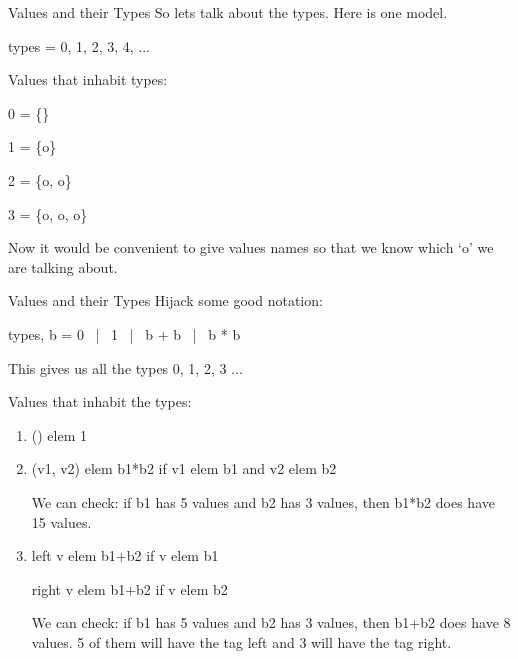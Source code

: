 \documentclass[svgnames,11pt]{beamer}
\begin{document}
\begin{frame}{Values and their Types}
So lets talk about the types. Here is one model. 

\vfill
\begin{block}

types = 0, 1, 2, 3, 4, ...   
\end{block}


\vfill
Values that inhabit types:

\begin{block}
  
0 = \{\}

1 = \{o\}

2 = \{o, o\}

3 = \{o, o, o\}
\end{block}

\vfill
\pause
Now it would be convenient to give values names so that we know which
`o' we are talking about.

\end{frame}

\begin{frame}[fragile]{Values and their Types}
Hijack some good notation:

\vfill
\begin{block}

  {{ types, b = 0 ~|~ 1 ~|~ b + b ~|~ b * b }}

\end{block}

\vfill
This gives us all the types 0, 1, 2, 3 ... 

\vfill
\pause
Values that inhabit the types:

\begin{enumerate}
\item 
{{() elem 1}}

\vfill
\pause
\item 
{{(v1, v2) elem b1*b2}} \pause if {{v1 elem b1}} and {{v2 elem b2}}

\pause
We can check: if {{b1}} has 5 values and {{b2}} has 3 values, then
{{b1*b2}} does have 15 values.

\vfill
\pause
\item 
{{left v elem b1+b2}} if {{v elem b1}}

\pause
{{right v elem b1+b2}} if {{v elem b2}}

\pause
We can check: if {{b1}} has 5 values and {{b2}} has 3 values, then
{{b1+b2}} does have 8 values. 5 of them will have the tag {{left}} and
3 will have the tag {{right}}.
\end{enumerate}


\end{frame}
\end{document}
